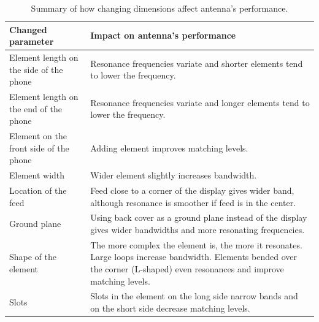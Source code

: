 \begin{table}[H]
    \centering
    \caption{Summary of how changing dimensions affect antenna's performance.}
    \label{tab:dimension_summary}
    \begin{tabular}{|p{}|p{}|}
        \hline
        \textbf{Changed parameter} & \textbf{Impact on antenna's performance} \\
        \hline
        Element length on the side of the phone & Resonance frequencies variate and shorter elements tend to lower the frequency.\\
        \hline
        Element length on the end of the phone & Resonance frequencies variate and longer elements tend to lower the frequency.\\
        \hline
        Element on the front side of the phone & Adding element improves matching levels.\\
        \hline
        Element width & Wider element slightly increases bandwidth.\\
        \hline
        Location of the feed & Feed close to a corner of the display gives wider band, although resonance is smoother if feed is in the center.\\
        \hline
        Ground plane & Using back cover as a ground plane instead of the display gives wider bandwidths and more resonating frequencies.\\
        \hline
        Shape of the element & The more complex the element is, the more it resonates. Large loops increase bandwidth. Elements bended over the corner (L-shaped) even resonances and improve matching levels.\\
        \hline
        Slots & Slots in the element on the long side narrow bands and on the short side decrease matching levels.\\
        \hline
    \end{tabular}
\end{table} 

\clearpage